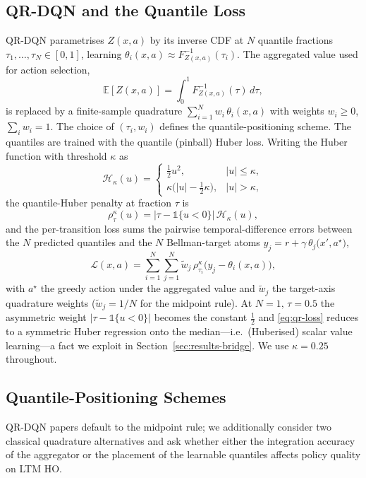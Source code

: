 \documentclass[conference]{IEEEtran}
\begin{document}
\subsection{QR-DQN and the Quantile Loss}
QR-DQN parametrises $Z(x,a)$ by its inverse CDF at $N$ quantile fractions
$\tau_1,\dots,\tau_N\in[0,1]$, learning
$\theta_i(x,a)\approx F^{-1}_{Z(x,a)}(\tau_i)$. The aggregated value used for
action selection,
\begin{equation}
\mathbb{E}[Z(x,a)] = \int_0^1 F^{-1}_{Z(x,a)}(\tau)\,d\tau,
\label{eq:expectation}
\end{equation}
is replaced by a finite-sample quadrature $\sum_{i=1}^{N} w_i\,\theta_i(x,a)$
with weights $w_i\ge 0$, $\sum_i w_i = 1$. The choice of $(\tau_i,w_i)$ defines
the quantile-positioning scheme. The quantiles are trained with the quantile
(pinball) Huber loss. Writing the Huber function with threshold $\kappa$ as
\begin{equation}
\mathcal{H}_\kappa(u) =
\begin{cases}
\tfrac12 u^2, & |u|\le\kappa,\\[2pt]
\kappa\big(|u|-\tfrac12\kappa\big), & |u|>\kappa,
\end{cases}
\end{equation}
the quantile-Huber penalty at fraction $\tau$ is
\begin{equation}
\rho^\kappa_\tau(u) = \big|\tau - \mathbb{1}\{u<0\}\big|\,
\mathcal{H}_\kappa(u),
\label{eq:pinball}
\end{equation}
and the per-transition loss sums the pairwise
temporal-difference errors between the $N$ predicted quantiles and the $N$
Bellman-target atoms $y_j = r + \gamma\,\theta_j\!\big(x',a^\star\big)$,
\begin{equation}
\mathcal{L}(x,a) = \sum_{i=1}^{N}\sum_{j=1}^{N}
   \tilde w_j\,\rho^{\kappa}_{\tau_i}\!\big(y_j - \theta_i(x,a)\big),
\label{eq:qr-loss}
\end{equation}
with $a^\star$ the greedy action under the aggregated value and $\tilde w_j$
the target-axis quadrature weights ($\tilde w_j{=}1/N$ for the midpoint rule).
At $N{=}1,\,\tau{=}0.5$ the asymmetric weight $|\tau-\mathbb{1}\{u<0\}|$ becomes
the constant $\tfrac12$ and \eqref{eq:qr-loss} reduces to a symmetric Huber
regression onto the median---i.e.\ (Huberised) scalar value learning---a fact
we exploit in Section~\ref{sec:results-bridge}. We use $\kappa{=}0.25$
throughout.

\subsection{Quantile-Positioning Schemes}
\label{sec:qmode-method}
QR-DQN papers default to the midpoint rule; we additionally consider two
classical quadrature alternatives and ask whether either the integration
accuracy of the aggregator or the placement of the learnable quantiles affects
policy quality on LTM HO.
\end{document}

